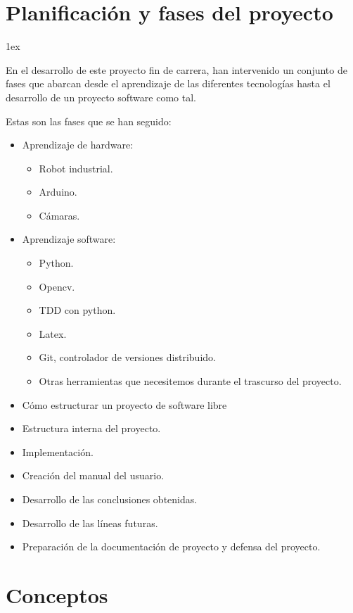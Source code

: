 \documentclass[12pt,a4papert,woside,openright,titlepage,final]{book}
\begin{document}
\section{Planificación y fases del proyecto}

\parskip 1ex

En el desarrollo de este proyecto fin de carrera, han intervenido un conjunto
de fases que abarcan desde el aprendizaje de las diferentes tecnologías hasta
el desarrollo de un proyecto software como tal.

Estas son las fases que se han seguido:

\begin{itemize}
	\item Aprendizaje de hardware:
    \begin{itemize}
        \item Robot industrial.
        \item Arduino.
        \item Cámaras.
    \end{itemize}
    \item Aprendizaje software:
    \begin{itemize}
        \item Python.
        \item Opencv.
        \item TDD con python.
        \item Latex.
        \item Git, controlador de versiones distribuido.
        \item Otras herramientas que necesitemos durante el trascurso del
        proyecto.
    \end{itemize}
    \item Cómo estructurar un proyecto de software libre
    \item Estructura interna del proyecto.
	\item Implementación.
	\item Creación del manual del usuario.
	\item Desarrollo de las conclusiones obtenidas.
	\item Desarrollo de las líneas futuras.
	\item Preparación de la documentación de proyecto y defensa del proyecto.
\end{itemize}


\section{Conceptos}
\end{document}
